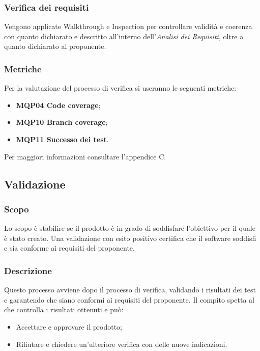 \subsubsection{Verifica dei requisiti}
Vengono applicate Walkthrough e Inspection per controllare validità e coerenza con quanto dichiarato e descritto all'interno dell'\textit{Analisi dei Requisiti}, oltre a quanto dichiarato al proponente.

\subsubsection{Metriche}
Per la valutazione del processo di verifica si useranno le seguenti metriche:
\begin{itemize}
\item \textbf{MQP04 Code coverage};
\item \textbf{MQP10 Branch coverage};
\item \textbf{MQP11 Successo dei test}.
\end{itemize}

Per maggiori informazioni consultare l'appendice C.

\subsection{Validazione}
\subsubsection{Scopo}
Lo scopo è stabilire se il prodotto è in grado di soddisfare l'obiettivo per il quale è stato creato. Una validazione con esito positivo certifica che il software soddisfi e sia conforme ai requisiti del proponente.

\subsubsection{Descrizione}
Questo processo avviene dopo il processo di verifica, validando i risultati dei test e garantendo che siano conformi ai requisiti del proponente. Il compito spetta al \RE che controlla i risultati ottenuti e può:
\begin{itemize}
\item Accettare e approvare il prodotto;
\item Rifiutare e chiedere un'ulteriore verifica con delle nuove indicazioni.
\end{itemize}

